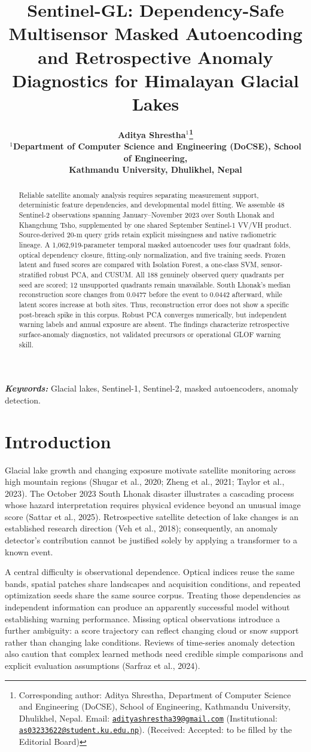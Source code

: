 \documentclass[10pt,twocolumn]{article}
\title{\vspace{-1.2em}\fontsize{12}{14}\selectfont\bfseries Sentinel-GL: Dependency-Safe Multisensor Masked Autoencoding and Retrospective Anomaly Diagnostics for Himalayan Glacial Lakes}
\author{\fontsize{10.5}{12.5}\selectfont\bfseries Aditya Shrestha$^{1}$\thanks{Corresponding author: Aditya Shrestha, Department of Computer Science and Engineering (DoCSE), School of Engineering, Kathmandu University, Dhulikhel, Nepal. Email: \href{mailto:adityashrestha39@gmail.com}{\nolinkurl{adityashrestha39@gmail.com}} (Institutional: \href{mailto:as03233622@student.ku.edu.np}{\nolinkurl{as03233622@student.ku.edu.np}}). (Received: \hspace{1.0cm} Accepted: to be filled by the Editorial Board)}\\
\small $^1$Department of Computer Science and Engineering (DoCSE), School of Engineering,\\
\small Kathmandu University, Dhulikhel, Nepal}
\date{}
\begin{document}
\fontsize{10.5}{12.0}\selectfont
\raggedbottom
\maketitle
\begin{abstract}
Reliable satellite anomaly analysis requires separating measurement support, deterministic feature dependencies, and developmental model fitting. We assemble 48 Sentinel-2 observations spanning January--November 2023 over South Lhonak and Khangchung Tsho, supplemented by one shared September Sentinel-1 VV/VH product. Source-derived 20-m query grids retain explicit missingness and native radiometric lineage. A 1,062,919-parameter temporal masked autoencoder uses four quadrant folds, optical dependency closure, fitting-only normalization, and five training seeds. Frozen latent and fused scores are compared with Isolation Forest, a one-class SVM, sensor-stratified robust PCA, and CUSUM. All 188 genuinely observed query quadrants per seed are scored; 12 unsupported quadrants remain unavailable. South Lhonak's median reconstruction score changes from 0.0477 before the event to 0.0442 afterward, while latent scores increase at both sites. Thus, reconstruction error does not show a specific post-breach spike in this corpus. Robust PCA converges numerically, but independent warning labels and annual exposure are absent. The findings characterize retrospective surface-anomaly diagnostics, not validated precursors or operational GLOF warning skill.
\end{abstract}
\noindent\textbf{\textit{Keywords:}} Glacial lakes, Sentinel-1, Sentinel-2, masked autoencoders, anomaly detection.

\section{Introduction}
Glacial lake growth and changing exposure motivate satellite monitoring across high mountain regions (Shugar et al., 2020; Zheng et al., 2021; Taylor et al., 2023). The October 2023 South Lhonak disaster illustrates a cascading process whose hazard interpretation requires physical evidence beyond an unusual image score (Sattar et al., 2025). Retrospective satellite detection of lake changes is an established research direction (Veh et al., 2018); consequently, an anomaly detector's contribution cannot be justified solely by applying a transformer to a known event.

A central difficulty is observational dependence. Optical indices reuse the same bands, spatial patches share landscapes and acquisition conditions, and repeated optimization seeds share the same source corpus. Treating those dependencies as independent information can produce an apparently successful model without establishing warning performance. Missing optical observations introduce a further ambiguity: a score trajectory can reflect changing cloud or snow support rather than changing lake conditions. Reviews of time-series anomaly detection also caution that complex learned methods need credible simple comparisons and explicit evaluation assumptions (Sarfraz et al., 2024).
\end{document}
